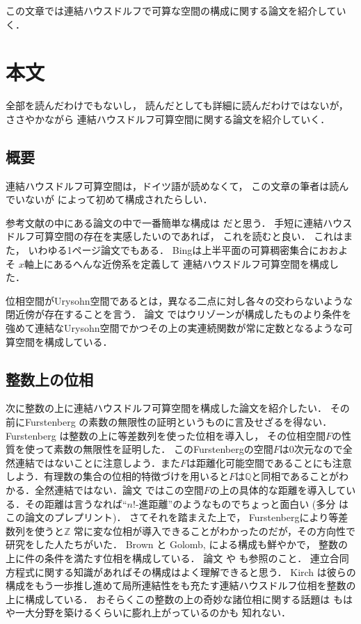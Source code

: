 \documentclass[leqno, a4paper, 12pt]{jsarticle}
\newcommand{\zz}{\mathbb{Z}}
\newcommand{\qq}{\mathbb{Q}}
\begin{document}
この文章では連結ハウスドルフで可算な空間の構成に関する論文を紹介していく．

\section{本文}

全部を読んだわけでもないし，
読んだとしても詳細に読んだわけではないが，ささやかながら
連結ハウスドルフ可算空間に関する論文を紹介していく．

 
 \subsection{概要}

連結ハウスドルフ可算空間は，ドイツ語が読めなくて，
この文章の筆者は読んでいないが
\cite{MR1512258}
によって初めて構成されたらしい．


参考文献の中にある論文の中で一番簡単な構成は
\cite{MR0060806}だと思う．
手短に連結ハウスドルフ可算空間の存在を実感したいのであれば，
これを読むと良い．
これはまた，
いわゆる1ページ論文でもある．
Bingは上半平面の可算稠密集合におおよそ
$x$軸上にあるへんな近傍系を定義して
連結ハウスドルフ可算空間を構成した．


位相空間がUrysohn空間であるとは，異なる二点に対し各々の交わらないような閉近傍が存在することを言う．
論文
\cite{MR0017527}ではウリゾーンが構成したものより条件を強めて連結なUrysohn空間でかつその上の実連続関数が常に定数となるような可算空間を構成している．

 
\subsection{整数上の位相}
次に整数の上に連結ハウスドルフ可算空間を構成した論文を紹介したい．
その前にFurstenberg
の素数の無限性の証明というものに言及せざるを得ない．
Furstenberg 
\cite{MR0068566}
は整数の上に等差数列を使った位相を導入し，
その位相空間$F$の性質を使って素数の無限性を証明した．
このFurstenbergの空間$F$は$0$次元なので全然連結ではないことに注意しよう．また$F$は距離化可能空間であることにも注意しよう．有理数の集合の位相的特徴づけを用いると$F$は$\qq$と同相であることがわかる．全然連結ではない．論文
\cite{MR3372067}ではこの空間$F$の上の具体的な距離を導入している．その距離は言うなれば``$n!$-進距離''のようなものでちょっと面白い
(多分\cite{lovas2010exotic}
はこの論文のプレプリント)．
さてそれを踏まえた上で，
Furstenbergにより等差数列を使うと$\zz$
常に変な位相が導入できることがわかったのだが，その方向性で研究をした人たちがいた．
Brown \cite{Brown}と
 Golomb,
\cite{MR0107622}による構成も鮮やかで，
整数の上に件の条件を満たす位相を構成している．
論文
\cite{MR0154249}
や
\cite{MR3905659}も参照のこと．
連立合同方程式に関する知識があればその構成はよく理解できると思う．
 Kirch
\cite{MR0239563}は彼らの構成をもう一歩推し進めて局所連結性をも充たす連結ハウスドルフ位相を整数の上に構成している．
おそらくこの整数の上の奇妙な諸位相に関する話題は
もはや一大分野を築けるくらいに膨れ上がっているのかも
知れない．
\end{document}
